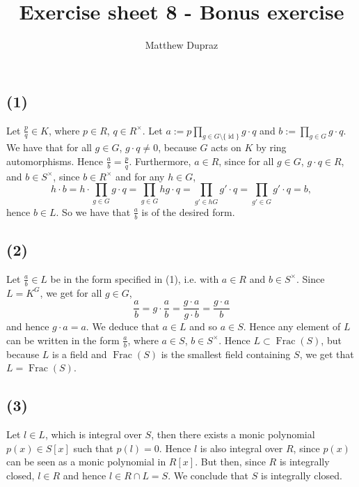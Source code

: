 \documentclass{article}
\title{Exercise sheet 8 - Bonus exercise}
\author{Matthew Dupraz}
\DeclareMathOperator{\Frac}{Frac}
\DeclareMathOperator{\id}{id}
\begin{document}
	
\maketitle

\subsection*{(1)}

Let $\frac{p}{q} \in K$, where $p \in R$, $q \in R^\times$.
Let $a := p \prod_{g \in G\setminus\{\id\}} g\cdot q$ and
$b := \prod_{g \in G}g \cdot q$.
We have that for all $g \in G$, $g \cdot q \neq 0$, because $G$ acts
on $K$ by ring automorphisms. Hence $\frac{a}{b} = \frac{p}{q}$.
Furthermore, $a \in R$, since for all $g \in G$, $g \cdot q \in R$,
and $b \in S^\times$, since $b \in R^\times$ and for any $h \in G$,
\begin{equation*}
	h \cdot b = h \cdot \prod_{g \in G} g \cdot q
	= \prod_{g \in G} hg \cdot q
	= \prod_{g' \in hG} g' \cdot q
	= \prod_{g' \in G} g' \cdot q = b,
\end{equation*}
hence $b \in L$. So we have that $\frac{a}{b}$ is of the desired form.

\subsection*{(2)}

Let $\frac{a}{b} \in L$ be in the form specified in (1), i.e. with $a \in R$
and $b \in S^\times$. Since $L = K^G$, we get for all $g \in G$,
\begin{equation*}
	\frac{a}{b} = g \cdot \frac{a}{b} = \frac{g \cdot a}{g \cdot b}
	= \frac{g \cdot a}{b}
\end{equation*}
and hence $g\cdot a = a$. We deduce that $a \in L$ and so $a \in S$.
Hence any element of $L$ can be written in the form $\frac{a}{b}$, where
$a \in S$, $b \in S^\times$. Hence $L \subset \Frac(S)$,
but because $L$ is a field and $\Frac(S)$ is the smallest field containing $S$,
we get that $L = \Frac(S)$.

\subsection*{(3)}

Let $l \in L$, which is integral over $S$, then there exists a monic polynomial
$p(x) \in S[x]$ such that $p(l) = 0$. Hence $l$ is also integral over $R$,
since $p(x)$ can be seen as a monic polynomial in $R[x]$.
But then, since $R$ is integrally closed, $l \in R$ and hence
$l \in R \cap L = S$. We conclude that $S$ is integrally closed.
\end{document}
